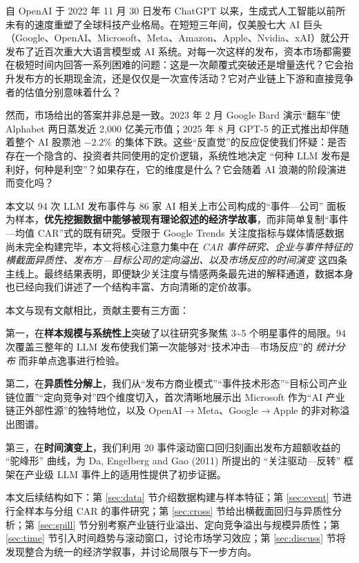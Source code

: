 \documentclass[11pt]{ctexart}
\begin{document}
自 OpenAI 于 2022 年 11 月 30 日发布 ChatGPT 以来，生成式人工智能以前所未有的速度重塑了全球科技产业格局。在短短三年间，仅美股七大 AI 巨头（Google、OpenAI、Microsoft、Meta、Amazon、Apple、Nvidia、xAI）就公开发布了近百次重大大语言模型或 AI 系统。对每一次这样的发布，资本市场都需要在极短时间内回答一系列困难的问题：这是一次颠覆式突破还是增量迭代？它会抬升发布方的长期现金流，还是仅仅是一次宣传活动？它对产业链上下游和直接竞争者的估值分别意味着什么？

然而，市场给出的答案并非总是一致。2023 年 2 月 Google Bard 演示“翻车”使 Alphabet 两日蒸发近 2{,}000 亿美元市值；2025 年 8 月 GPT-5 的正式推出却伴随着整个 AI 股票池 $-2.2\%$ 的集体下跌。这些“反直觉”的反应促使我们怀疑：是否存在一个隐含的、投资者共同使用的定价逻辑，系统性地决定 “何种 LLM 发布是利好，何种是利空”？如果存在，它的维度是什么？它会随着 AI 浪潮的阶段演进而变化吗？

本文以 94 次 LLM 发布事件与 86 家 AI 相关上市公司构成的“事件—公司” 面板为样本，\textbf{优先挖掘数据中能够被现有理论叙述的经济学故事}，而非简单复制“事件—均值 CAR”式的既有研究。受限于 Google Trends 关注度指标与媒体情感数据尚未完全构建完毕，本文将核心注意力集中在 \emph{CAR 事件研究、企业与事件特征的横截面异质性、发布方—目标公司的定向溢出、以及市场反应的时间演变} 这四条主线上。最终结果表明，即便缺少关注度与情感两条最先进的解释通道，数据本身也已经向我们讲述了一个结构丰富、方向清晰的定价故事。

本文与现有文献相比，贡献主要有三方面：

第一，在\textbf{样本规模与系统性上}突破了以往研究多聚焦 3\textasciitilde 5 个明星事件的局限。94 次覆盖三整年的 LLM 发布使我们第一次能够对“技术冲击—市场反应”的 \emph{统计分布} 而非单点逸事进行检验。

第二，在\textbf{异质性分解上}，我们从“发布方商业模式”“事件技术形态”“目标公司产业链位置”“定向竞争对”四个维度切入，首次清晰地展示出 Microsoft 作为“AI 产业链正外部性源”的独特地位，以及 OpenAI$\to$Meta、Google$\to$Apple 的非对称溢出图谱。

第三，在\textbf{时间演变上}，我们利用 20 事件滚动窗口回归刻画出发布方超额收益的 “驼峰形” 曲线，为 Da, Engelberg and Gao (2011) 所提出的 “关注驱动—反转” 框架在产业级 LLM 事件上的适用性提供了初步证据。

本文后续结构如下：第 \ref{sec:data} 节介绍数据构建与样本特征；第 \ref{sec:event} 节进行全样本与分组 CAR 的事件研究；第 \ref{sec:cross} 节给出横截面回归与异质性分析；第 \ref{sec:spill} 节分别考察产业链行业溢出、定向竞争溢出与规模异质性；第 \ref{sec:time} 节引入时间趋势与滚动窗口，讨论市场学习效应；第 \ref{sec:discuss} 节将发现整合为统一的经济学叙事，并讨论局限与下一步方向。
\end{document}
